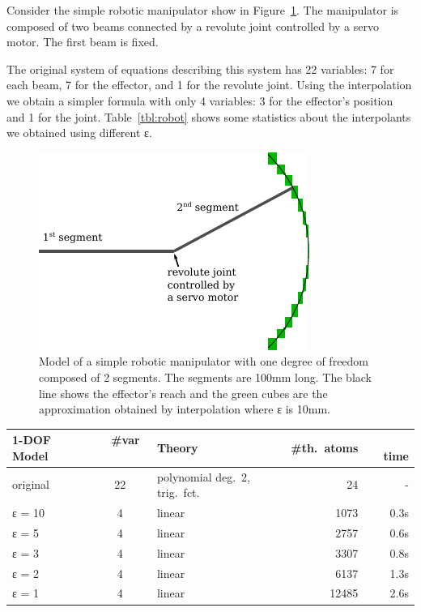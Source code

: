 \begin{example}
Consider the simple robotic manipulator show in Figure~\ref{fig:robot}.
The manipulator is composed of two beams connected by a revolute joint controlled by a servo motor.
The first beam is fixed.

The original system of equations describing this system has 22 variables: 7 for each beam, 7 for the effector, and 1 for the revolute joint.
Using the interpolation we obtain a simpler formula with only 4 variables: 3 for the effector's position and 1 for the joint.
Table~\ref{tbl:robot} shows some statistics about the interpolants we obtained using different ε.


\begin{figure}
\centering
\includegraphics[scale=1]{img/arm.pdf}
\caption{
    Model of a simple robotic manipulator with one degree of freedom composed of 2 segments.
    The segments are 100mm long.
    The black line shows the effector's reach and the green cubes are the approximation obtained by interpolation where ε is 10mm.
}
\label{fig:robot}
\end{figure}

\begin{table}
\centering
\begin{tabular}{l|clrr}
1-DOF Model & ~ \#var  ~~ & Theory   & \#th.~atoms & ~~ time \\
\hline
original & 22 & polynomial deg.~2, trig.~fct.   & 24    & - \\
ε = 10   & 4  & linear                          & 1073  & 0.3s \\
ε = 5    & 4  & linear                          & 2757  & 0.6s \\
ε = 3    & 4  & linear                          & 3307  & 0.8s \\
ε = 2    & 4  & linear                          & 6137  & 1.3s \\
ε = 1    & 4  & linear                          & 12485 & 2.6s \\
\end{tabular}


\end{table}
\end{example}
